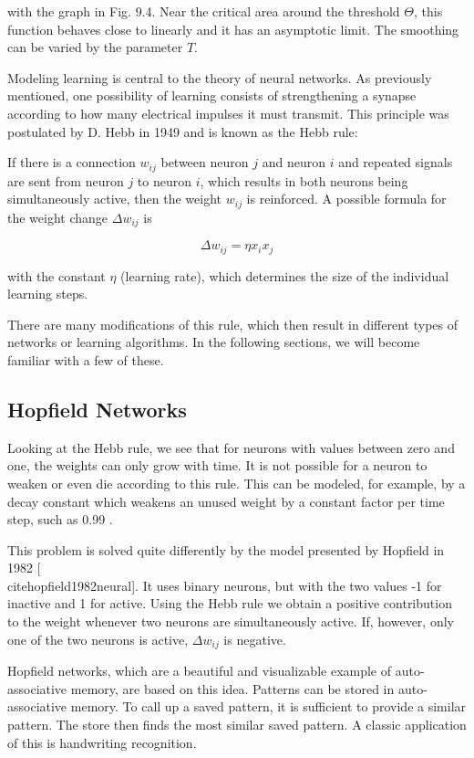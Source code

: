 \documentclass[10pt]{book}
\begin{document}
with the graph in Fig. 9.4. Near the critical area around the threshold $\Theta$, this function behaves close to linearly and it has an asymptotic limit. The smoothing can be varied by the parameter $T$.

Modeling learning is central to the theory of neural networks. As previously mentioned, one possibility of learning consists of strengthening a synapse according to how many electrical impulses it must transmit. This principle was postulated by D. Hebb in 1949 and is known as the Hebb rule:

If there is a connection $w_{i j}$ between neuron $j$ and neuron $i$ and repeated signals are sent from neuron $j$ to neuron $i$, which results in both neurons being simultaneously active, then the weight $w_{i j}$ is reinforced. A possible formula for the weight change $\Delta w_{i j}$ is

$$
\Delta w_{i j}=\eta x_{i} x_{j}
$$

with the constant $\eta$ (learning rate), which determines the size of the individual learning steps.

There are many modifications of this rule, which then result in different types of networks or learning algorithms. In the following sections, we will become familiar with a few of these.

\subsection*{Hopfield Networks}
Looking at the Hebb rule, we see that for neurons with values between zero and one, the weights can only grow with time. It is not possible for a neuron to weaken or even die according to this rule. This can be modeled, for example, by a decay constant which weakens an unused weight by a constant factor per time step, such as 0.99 .

This problem is solved quite differently by the model presented by Hopfield in 1982 [\\cite{hopfield1982neural}]. It uses binary neurons, but with the two values -1 for inactive and 1 for active. Using the Hebb rule we obtain a positive contribution to the weight whenever two neurons are simultaneously active. If, however, only one of the two neurons is active, $\Delta w_{i j}$ is negative.

Hopfield networks, which are a beautiful and visualizable example of auto-associative memory, are based on this idea. Patterns can be stored in auto-associative memory. To call up a saved pattern, it is sufficient to provide a similar pattern. The store then finds the most similar saved pattern. A classic application of this is handwriting recognition.
\end{document}
